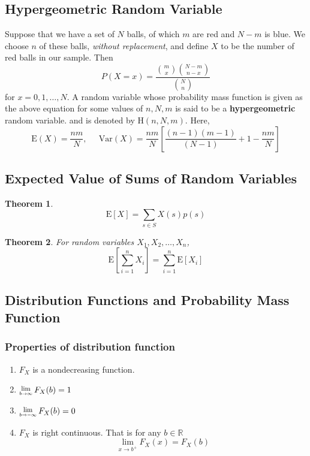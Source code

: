 \documentclass[12pt]{article}
\newcommand{\var}{\mathrm{Var}}
\newcommand{\expec}{\mathrm{E}}
\newcommand{\hg}{\mathrm{H}}
\newcommand{\Lim}[1]{\raisebox{0.5ex}{\scalebox{0.8}{$\displaystyle \lim_{#1}\;$}}}
\newtheorem{theorem}{Theorem}[section]
\theoremstyle{definition}
\begin{document}
\subsection{Hypergeometric Random Variable}
Suppose that we have a set of $N$ balls, of which $m$ are red and $N-m$ is blue. We choose $n$ of these balls, \textit{without replacement}, and define $X$ to be the number of red balls in our sample. Then
\[
P(X=x)=\frac{\binom{m}{x}\binom{N-m}{n-x}}{\binom{N}{n}}
\]
for $x = 0,1,\ldots,N$.
A random variable whose probability mass function is given as the above equation for some values of $n,N,m$ is said to be a \textbf{hypergeometric} random variable. and is denoted by $\hg(n,N,m)$. Here,
\[
\expec(X)=\frac{nm}{N},\;\;\;\;\;\var(X)=\frac{nm}{N}\left[\frac{(n-1)(m-1)}{(N-1)}+1-\frac{nm}{N}\right]
\]
\subsection{Expected Value of Sums of Random Variables}
\begin{theorem}
\[
\expec[X]=\sum_{s\in S}X(s)p(s)
\]
\end{theorem}
\begin{theorem}
\normalfont
For random variables $X_1,X_2,\ldots, X_n$,
\[
\expec\left[\sum_{i=1}^n X_i\right]=\sum_{i=1}^n \expec[X_i]
\]
\end{theorem}
\subsection{Distribution Functions and Probability Mass Function}
\subsubsection{Properties of distribution function}
\begin{enumerate}
\item $F_X$ is a nondecreasing function.
\item $\Lim{b\to\infty}F_X(b)=1$
\item $\Lim{b\to-\infty}F_X(b)=0$
\item $F_X$ is right continuous. That is for any $b\in\mathbb{R}$
\[
\lim_{x\to b^+}F_X(x)=F_X(b)
\]
\end{enumerate}
\end{document}
